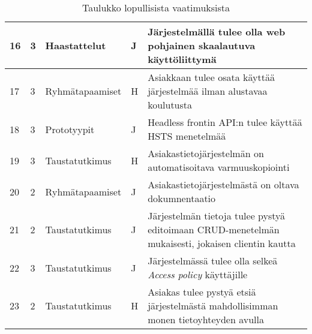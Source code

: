 \begin{landscape}
\begin{table}[]
{\begin{tabular}{lllll}
    \multicolumn{1}{|l|}{16}		&			 \multicolumn{1}{|l|}{3}& \multicolumn{1}{l|}{Haastattelut}	& \multicolumn{1}{l|}{J}                                    & \multicolumn{1}{l|}{Järjestelmällä tulee olla web pohjainen skaalautuva käyttöliittymä}                               \\ \hline
    \multicolumn{1}{|l|}{17}		&			 \multicolumn{1}{|l|}{3}& \multicolumn{1}{l|}{Ryhmätapaamiset}	& \multicolumn{1}{l|}{H}                                    & \multicolumn{1}{l|}{Asiakkaan tulee osata käyttää järjestelmää ilman alustavaa koulutusta}                               \\ \hline
    \multicolumn{1}{|l|}{18}		&			 \multicolumn{1}{|l|}{3}& \multicolumn{1}{l|}{Prototyypit}	& \multicolumn{1}{l|}{J}                                    & \multicolumn{1}{l|}{Headless frontin API:n tulee käyttää HSTS menetelmää}																	\\ \hline
    \multicolumn{1}{|l|}{19}		&			 \multicolumn{1}{|l|}{3}& \multicolumn{1}{l|}{Taustatutkimus}	& \multicolumn{1}{l|}{H}                                    & \multicolumn{1}{l|}{Asiakastietojärjestelmän on automatisoitava varmuuskopiointi}								\\ \hline
    \multicolumn{1}{|l|}{20}		&			 \multicolumn{1}{|l|}{2}& \multicolumn{1}{l|}{Ryhmätapaamiset}	& \multicolumn{1}{l|}{J}                                    & \multicolumn{1}{l|}{Asiakastietojärjestelmästä on oltava dokumnentaatio}														\\ \hline
    \multicolumn{1}{|l|}{21}		&			 \multicolumn{1}{|l|}{2}& \multicolumn{1}{l|}{Taustatutkimus}	& \multicolumn{1}{l|}{J}                                    & \multicolumn{1}{l|}{Järjestelmän tietoja tulee pystyä editoimaan CRUD-menetelmän mukaisesti, jokaisen clientin kautta}									\\ \hline
    \multicolumn{1}{|l|}{22}		&			 \multicolumn{1}{|l|}{3}& \multicolumn{1}{l|}{Taustatutkimus}	& \multicolumn{1}{l|}{J}                                    & \multicolumn{1}{l|}{Järjestelmässä tulee olla selkeä \textit{Access policy} käyttäjille}						\\ \hline
    \multicolumn{1}{|l|}{23}		&			 \multicolumn{1}{|l|}{2}& \multicolumn{1}{l|}{Taustatutkimus}	& \multicolumn{1}{l|}{H}                                    & \multicolumn{1}{l|}{Asiakas tulee pystyä etsiä järjestelmästä mahdollisimman monen tietoyhteyden avulla}						\\ \hline
                         
    


\end{tabular}
}
    \caption{Taulukko lopullisista vaatimuksista}
    \end{table}	
\end{landscape}